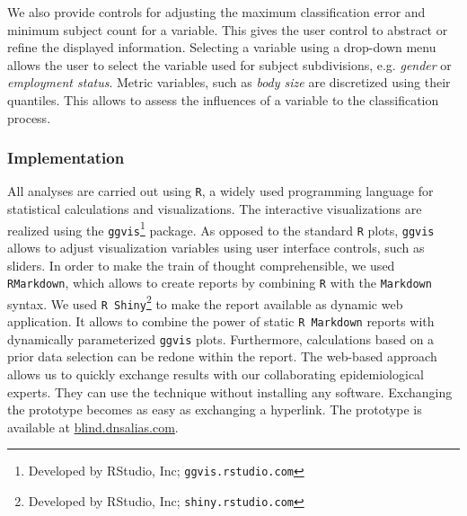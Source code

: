 \documentclass[a4paper,twoside]{style/article}
\begin{document}
We also provide controls for adjusting the maximum classification error and minimum subject count for a variable.
This gives the user control to abstract or refine the displayed information.
Selecting a variable using a drop-down menu allows the user to select the variable used for subject subdivisions, e.g. \emph{gender} or \emph{employment status}.
Metric variables, such as \emph{body size} are discretized using their quantiles.
This allows to assess the influences of a variable to the classification process.
\subsubsection{Implementation}
All analyses are carried out using \texttt{R}, a widely used programming language for statistical calculations and visualizations.
The interactive visualizations are realized using the \texttt{ggvis}\footnote{Developed by RStudio, Inc; \texttt{ggvis.rstudio.com}} package.
As opposed to the standard \texttt{R} plots, \texttt{ggvis} allows to adjust visualization variables using user interface controls, such as sliders.
In order to make the train of thought comprehensible, we used \texttt{RMarkdown}, which allows to create reports by combining \texttt{R} with the \texttt{Markdown} syntax.
We used \texttt{R Shiny}\footnote{Developed by RStudio, Inc; \texttt{shiny.rstudio.com}} to make the report available as dynamic web application.
It allows to combine the power of static \texttt{R Markdown} reports with dynamically parameterized \texttt{ggvis} plots.
Furthermore, calculations based on a prior data selection can be redone within the report.
The web-based approach allows us to quickly exchange results with our collaborating epidemiological experts.
They can use the technique without installing any software.
Exchanging the prototype becomes as easy as exchanging a hyperlink.
The prototype is available at \url{blind.dnsalias.com}.
\end{document}
